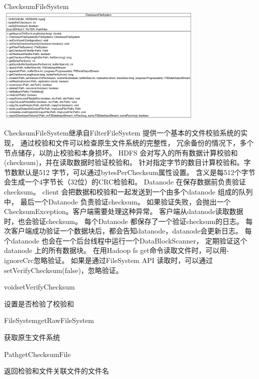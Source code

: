 \begin{XeClass}{ChecksumFileSystem}
\includegraphics[width=10cm]{cdig/ChecksumFileSystem.png}
     
 ChecksumFileSystem继承自FilterFileSystem
 提供一个基本的文件校验系统的实现，
 通过校验和文件可以检查原生文件系统的完整性，
 冗余备份的情况下，多个节点储存，以防止校验和本身损坏。
 HDFS 会对写入的所有数据计算校验和(checksum)，并在读取数据时验证校验和。
 针对指定字节的数目计算校验和。字节数默认是512 字节，可以通过bytesPerChecksum属性设置。
 含义是每512个字节会生成一个4字节长（32位）的CRC检验和。
 Datanode 在保存数据前负责验证checksum。
 client 会把数据和校验和一起发送到一个由多个datanode 组成的队列中，
 最后一个Datanode 负责验证checksum。
 如果验证失败，会抛出一个ChecksumException。客户端需要处理这种异常。   
 客户端从datanode读取数据时，也会验证checksum。
 每个Datanode 都保存了一个验证checksum的日志。
 每次客户端成功验证一个数据块后，都会告知datanode，datanode会更新日志。
 每个datanode 也会在一个后台线程中运行一个DataBlockScanner，
 定期验证这个 datanode 上的所有数据块。   
 在用Hadoop fs get命令读取文件时，可以用-ignoreCrc忽略验证。
 如果是通过FileSystem API 读取时，可以通过setVerifyChecksum(false)，忽略验证。 

    \begin{XeMethod}{\XePublic}{void}{setVerifyChecksum}
         
 设置是否检验了校验和

    \end{XeMethod}

    \begin{XeMethod}{\XePublic}{FileSystem}{getRawFileSystem}
         
 获取原生文件系统

    \end{XeMethod}

    \begin{XeMethod}{\XePublic}{Path}{getChecksumFile}
         
 返回检验和文件关联文件的文件名


\end{XeMethod}
\end{XeClass}
